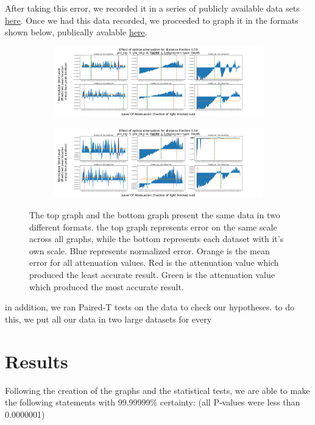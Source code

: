 \documentclass{article}
\begin{document}
After taking this error, we recorded it in a series of publicly available data sets \href{https://github.com/yggaraxyg/SPCErrorLowerer/tree/master/RunData}{here}. Once we had this data recorded, we proceeded to graph it in the formats shown below, publically avalable \href{https://github.com/yggaraxyg/SPCErrorLowerer/tree/master/Graphs}{here}.

\begin{figure}[H]
\centering
\begin{subfigure}[b]{1\textwidth}
\includegraphics[width=1\linewidth]{SharedyExample.png}
\label{fig:Ng1}
\end{subfigure}
\begin{subfigure}[b]{1\textwidth}
\includegraphics[width=1\linewidth]{ZoomedyExample.png}
\label{fig:Ng2}
\end{subfigure}

\caption{\label{fig:Data}The top graph and the bottom graph present the same data in two different formats. the top graph represents error on the same scale across all graphs, while the bottom represents each dataset with it's own scale. Blue represents normalized error. Orange is the mean error for all attenuation values. Red is the attenuation value which produced the least accurate result. Green is the attenuation value which produced the most accurate result.}
\end{figure}

in addition, we ran Paired-T tests on the data to check our hypotheses. to do this, we put all our data in two large datasets for every 


\section{Results}
Following the creation of the graphs and the statistical tests, we are able to make the following statements with 99.99999\% certainty: (all P-values were less than 0.0000001)
\end{document}
